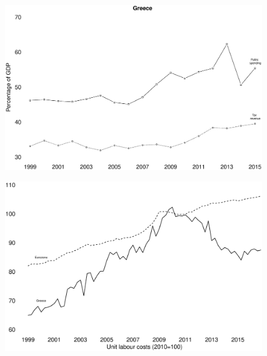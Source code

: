 \documentclass{beamer}
\begin{document}
\begin{frame}
  \begin{figure}
    \includegraphics[scale=.3]{greece3.eps}
  \end{figure}
\end{frame}

\begin{frame}
  \begin{figure}
    \includegraphics[scale=.3]{greece4.eps}
  \end{figure}
\end{frame}
\end{document}
